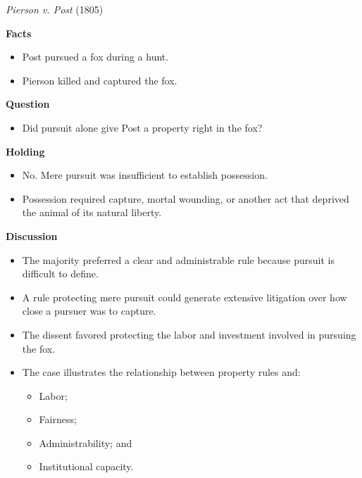 \documentclass[11pt]{tex/lawoutline}
\begin{document}
\casebox
{\textit{Pierson v. Post} (1805)}
{}
{
\textbf{Facts}
\begin{itemize}
    \item Post pursued a fox during a hunt.
    \item Pierson killed and captured the fox.
\end{itemize}

\textbf{Question}
\begin{itemize}
    \item Did pursuit alone give Post a property right in the fox?
\end{itemize}

\textbf{Holding}
\begin{itemize}
    \item No. Mere pursuit was insufficient to establish possession.
    \item Possession required capture, mortal wounding, or another act that deprived the animal of its natural liberty.
\end{itemize}

\textbf{Discussion}
\begin{itemize}
    \item The majority preferred a clear and administrable rule because pursuit is difficult to define.
    \item A rule protecting mere pursuit could generate extensive litigation over how close a pursuer was to capture.
    \item The dissent favored protecting the labor and investment involved in pursuing the fox.
    \item The case illustrates the relationship between property rules and:
    \begin{itemize}
        \item Labor;
        \item Fairness;
        \item Administrability; and
        \item Institutional capacity.
    \end{itemize}
\end{itemize}
}

\end{document}
